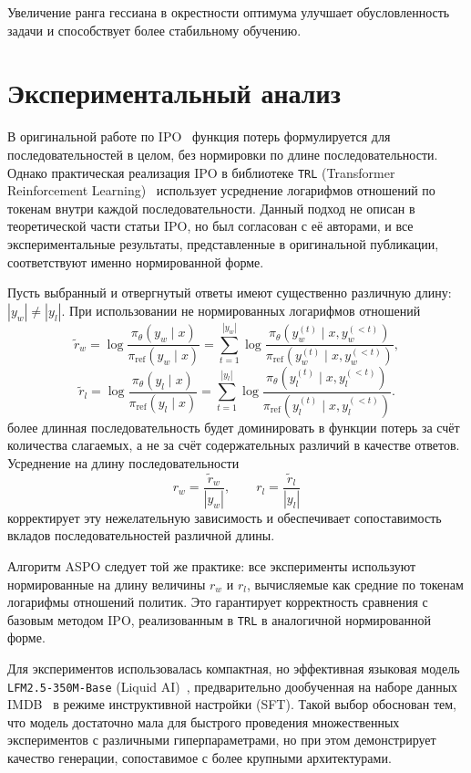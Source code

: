 \documentclass[a4paper,12pt]{article}
\begin{document}
Увеличение ранга гессиана в окрестности оптимума улучшает обусловленность задачи и способствует более стабильному обучению.


\section{Экспериментальный анализ}

В оригинальной работе по IPO~\cite{azar2024general} функция потерь формулируется для последовательностей в целом, без нормировки по длине последовательности. Однако практическая реализация IPO в библиотеке \texttt{TRL} (Transformer Reinforcement Learning)~\cite{vonwerra2022trl} использует усреднение логарифмов отношений по токенам внутри каждой последовательности. Данный подход не описан в теоретической части статьи IPO, но был согласован с её авторами, и все экспериментальные результаты, представленные в оригинальной публикации, соответствуют именно нормированной форме.

Пусть выбранный и отвергнутый ответы имеют существенно различную длину: $|y_w| \neq |y_l|$. При использовании не нормированных логарифмов отношений
\[
\tilde r_w =  \log \frac{\pi_\theta(y_w \mid x)}{\pi_{\text{ref}}(y_w \mid x)} =\sum_{t=1}^{|y_w|} \log \frac{\pi_\theta(y_w^{(t)} \mid x, y_w^{(<t)})}{\pi_{\text{ref}}(y_w^{(t)} \mid x, y_w^{(<t)})},
\]
\[
\tilde r_l = \log \frac{\pi_\theta(y_l \mid x)}{\pi_{\text{ref}}(y_l \mid x)} = \sum_{t=1}^{|y_l|} \log \frac{\pi_\theta(y_l^{(t)} \mid x, y_l^{(<t)})}{\pi_{\text{ref}}(y_l^{(t)} \mid x, y_l^{(<t)})}.
\]
более длинная последовательность будет доминировать в функции потерь за счёт количества слагаемых, а не за счёт содержательных различий в качестве ответов. Усреднение на длину последовательности
\[
r_w = \frac{\tilde{r}_w}{|y_w|}, \qquad r_l = \frac{\tilde{r}_l}{|y_l|}
\]
корректирует эту нежелательную зависимость и обеспечивает сопоставимость вкладов последовательностей различной длины.

Алгоритм ASPO следует той же практике: все эксперименты используют нормированные на длину величины $r_w$ и $r_l$, вычисляемые как средние по токенам логарифмы отношений политик. Это гарантирует корректность сравнения с базовым методом IPO, реализованным в \texttt{TRL} в аналогичной нормированной форме.

Для экспериментов использовалась компактная, но эффективная языковая модель \texttt{LFM2.5-350M-Base} (Liquid AI)~\cite{liquidAI2026350M}, предварительно дообученная на наборе данных IMDB~\cite{maas2011learning} в режиме инструктивной настройки (SFT). Такой выбор обоснован тем, что модель достаточно мала для быстрого проведения множественных экспериментов с различными гиперпараметрами, но при этом демонстрирует качество генерации, сопоставимое с более крупными архитектурами.
\end{document}
